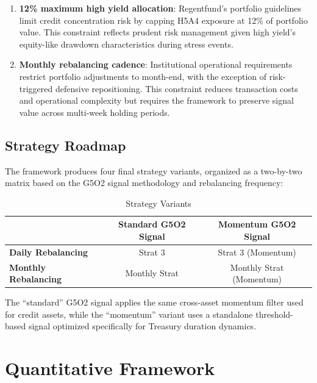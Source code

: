 \documentclass[11pt]{article}
\begin{document}
\begin{enumerate}
    \item \textbf{12\% maximum high yield allocation}: Regentfund's portfolio guidelines limit credit concentration risk by capping H5A4 exposure at 12\% of portfolio value. This constraint reflects prudent risk management given high yield's equity-like drawdown characteristics during stress events.

    \item \textbf{Monthly rebalancing cadence}: Institutional operational requirements restrict portfolio adjustments to month-end, with the exception of risk-triggered defensive repositioning. This constraint reduces transaction costs and operational complexity but requires the framework to preserve signal value across multi-week holding periods.
\end{enumerate}

\subsection{Strategy Roadmap}

The framework produces four final strategy variants, organized as a two-by-two matrix based on the G5O2 signal methodology and rebalancing frequency:

\begin{table}[H]
\centering
\caption{Strategy Variants}
\begin{tabular}{lcc}
\toprule
& \textbf{Standard G5O2 Signal} & \textbf{Momentum G5O2 Signal} \\
\midrule
\textbf{Daily Rebalancing} & Strat 3 & Strat 3 (Momentum) \\
\textbf{Monthly Rebalancing} & Monthly Strat & Monthly Strat (Momentum) \\
\bottomrule
\end{tabular}
\end{table}

The ``standard'' G5O2 signal applies the same cross-asset momentum filter used for credit assets, while the ``momentum'' variant uses a standalone threshold-based signal optimized specifically for Treasury duration dynamics.

\section{Quantitative Framework}
\end{document}
